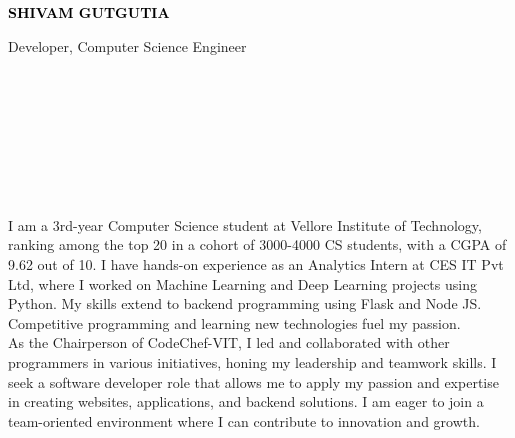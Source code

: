 \documentclass[9pt]{developercv}
\begin{document}

\begin{minipage}[t]{0.5\textwidth}
  \vspace{-\baselineskip}

  { \fontsize{16}{20} \textcolor{black}{\textbf{\MakeUppercase{Shivam Gutgutia}}}}

  \vspace{6pt}

  {\Large Developer, Computer Science Engineer}
\end{minipage}
\hfill
\begin{minipage}[t]{0.2\textwidth}
  \vspace{-\baselineskip}
  \\
  \\
  \\

\end{minipage}
\begin{minipage}[t]{0.27\textwidth}
  \vspace{-\baselineskip}

  \\
  \\
  \\

\end{minipage}


\vspace{-10pt}
\vspace{-10pt}

\hfill
I am a 3rd-year Computer Science student at Vellore Institute of Technology, ranking among the top 20 in a cohort of 3000-4000 CS students, with a CGPA of 9.62 out of 10. I have hands-on experience as an Analytics Intern at CES IT Pvt Ltd, where I worked on Machine Learning and Deep Learning projects using Python. My skills extend to backend programming using Flask and Node JS. Competitive programming and learning new technologies fuel my passion. \\

As the Chairperson of CodeChef-VIT, I led and collaborated with other programmers in various initiatives, honing my leadership and teamwork skills. I seek a software developer role that allows me to apply my passion and expertise in creating websites, applications, and backend solutions. I am eager to join a team-oriented environment where I can contribute to innovation and growth.
\end{document}
